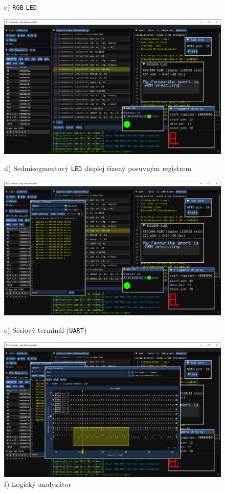 \documentclass[compress]{beamer}
\begin{document}
\begin{frame}
\begin{overlayarea}{\textwidth}{\textheight}
\begin{figure}
{				\vspace{-0.4cm}
				\caption{c) \texttt{RGB} \texttt{LED}}
			}%
			{%
				\includegraphics[width=.85\textwidth]{img/screenshot-05.pdf}%
				\vspace{-0.4cm}
				\caption{d) Sedmisegmentový \texttt{LED} displej řízený posuvným registrem}
			}%
			{%
				\includegraphics[width=.85\textwidth]{img/screenshot-06.pdf}%
				\vspace{-0.4cm}
				\caption{e) Sériový terminál (\texttt{UART})}
			}%
			{%
				\includegraphics[width=.85\textwidth]{img/screenshot-07.pdf}%
				\vspace{-0.4cm}
				\caption{f) Logický analyzátor}
			}%
		\end{figure}
	\end{overlayarea}
\end{frame}
\end{document}
